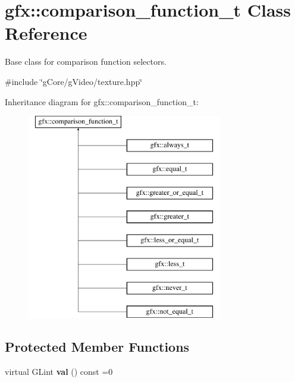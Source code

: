 \hypertarget{classgfx_1_1comparison__function__t}{\section{gfx\-:\-:comparison\-\_\-function\-\_\-t Class Reference}
\label{classgfx_1_1comparison__function__t}
}


Base class for comparison function selectors.  




{\ttfamily \#include \char`\"{}g\-Core/g\-Video/texture.\-hpp\char`\"{}}

Inheritance diagram for gfx\-:\-:comparison\-\_\-function\-\_\-t\-:\begin{figure}[H]
\begin{center}
\leavevmode
\includegraphics[height=9.000000cm]{classgfx_1_1comparison__function__t}
\end{center}
\end{figure}
\subsection*{Protected Member Functions}
\begin{DoxyCompactItemize}
\item 
\hypertarget{classgfx_1_1comparison__function__t_a173213f45db0d1b518d6b7950517755e}{virtual G\-Lint {\bfseries val} () const =0}\label{classgfx_1_1comparison__function__t_a173213f45db0d1b518d6b7950517755e}

\end{DoxyCompactItemize}
